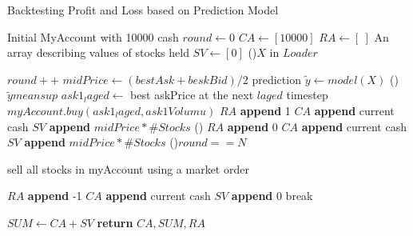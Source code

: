 \documentclass{\SetClass}
\begin{document}
\begin{algorithm}
\caption{Backtesting Profit and Loss based on Prediction Model}\label{algorithm}
Initial MyAccount with 10000 cash\;
$round\leftarrow 0$ \;
$CA\leftarrow [10000]$ \;
$RA\leftarrow [\ ]$\;
An array describing values of stocks held $SV\leftarrow [0]$\;
\ForEach(){$X$ in $Loader$}{
    $round++$\;
    $midPrice\leftarrow (bestAsk+beskBid)/2$\;
    prediction $\widetilde{y}\leftarrow model(X)$\;
    \uIf(){$\widetilde{y} means up$}{
        $ask1_laged \leftarrow$ best askPrice at the next $laged$ timestep\;
        $myAccount.buy(ask1_laged,ask1Volumu)$\;
        $RA$ \textbf{append} 1\;
        $CA$ \textbf{append} current cash\;
        $SV$ \textbf{append} $midPrice*\#Stocks$\;
    }
    \uElse(){
        $RA$ \textbf{append} 0\;
        $CA$ \textbf{append} current cash\;
        $SV$ \textbf{append} $midPrice*\#Stocks$\;
    }
    \uIf(){$round==N$}{
        sell all stocks in myAccount using a market order\;

        $RA$ \textbf{append} -1\;
        $CA$ \textbf{append} current cash\;
        $SV$ \textbf{append} 0\;
        break\;
    }
}
$SUM \leftarrow CA+SV$\;
\textbf{return} $CA,SUM,RA$\;
\end{algorithm}
\end{document}
